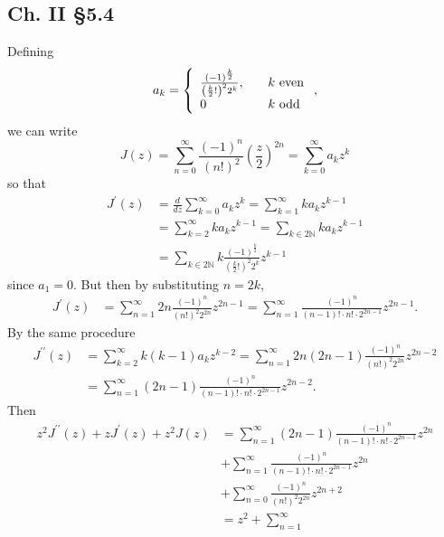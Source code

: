 \documentclass{article}
\begin{document}
\subsection*{Ch. II \S 5.4}
Defining
$$
a_k
=
\left\{\begin{array}{l l}
  \frac{(-1)^{\frac{k}{2}}}{\left(\frac{k}{2}!\right)^2 2^k},
    & \quad k \text{ even} \\
  0 & \quad k \text{ odd}
\end{array}\right.,
$$
we can write
$$
  J(z)
= \sum_{n=0}^\infty \frac{(-1)^n}{(n!)^2}\left(\frac{z}{2}\right)^{2n}
= \sum_{k=0}^\infty a_k z^k
$$
so that
\begin{align*}
   J^\prime(z)
&= \frac{d}{dz} \sum_{k=0}^\infty a_k z^k
 = \sum_{k=1}^\infty k a_k z^{k-1} \\
&= \sum_{k=2}^\infty k a_k z^{k-1}
 = \sum_{k \in 2\mathbb{N}} k a_k z^{k-1} \\
&= \sum_{k \in 2\mathbb{N}} k \frac{(-1)^{\frac{k}{2}}}{\left(\frac{k}{2}!\right)^2 2^k} z^{k-1}
\end{align*}
since $a_1 = 0$. But then by substituting $n = 2k$,
\begin{align*}
   J^\prime(z)
&= \sum_{n=1}^\infty 2n \frac{(-1)^{n}}{(n!)^2 2^{2n}} z^{2n-1}
 = \sum_{n=1}^\infty \frac{(-1)^n}{(n-1)! \cdot n! \cdot 2^{2n-1}} z^{2n-1}.
\end{align*}
By the same procedure
\begin{align*}
   J^{\prime\prime}(z)
&= \sum_{k=2}^\infty k (k-1) a_k z^{k-2}
 = \sum_{n=1}^\infty 2n (2n-1) \frac{(-1)^{n}}{(n!)^2 2^{2n}} z^{2n-2} \\
&= \sum_{n=1}^\infty (2n-1) \frac{(-1)^n}{(n-1)! \cdot n! \cdot 2^{2n-1}} z^{2n-2}.
\end{align*}
Then
\begin{align*}
   z^2 J^{\prime\prime}(z) + z J^\prime(z) + z^2 J(z)
&= \sum_{n=1}^\infty (2n-1) \frac{(-1)^n}{(n-1)! \cdot n! \cdot 2^{2n-1}} z^{2n} \\
&+ \sum_{n=1}^\infty \frac{(-1)^n}{(n-1)! \cdot n! \cdot 2^{2n-1}} z^{2n} \\
&+ \sum_{n=0}^\infty \frac{(-1)^n}{(n!)^2 2^{2n}} z^{2n + 2} \\
&= z^2 + \sum_{n=1}^\infty
\end{align*}
\end{document}
